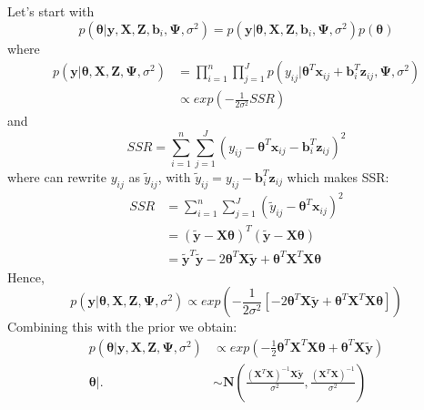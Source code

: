 \documentclass[a4paper]{article}
\begin{document}
Let's start with
 \begin{equation*}
	p(\bm{\theta}|\bm{y}, \bm{X}, \bm{Z}, \bm{b}_{i}, \bm{\Psi}, \sigma^2) = 	p(\bm{y}|\bm{\theta}, \bm{X}, \bm{Z}, \bm{b}_{i}, \bm{\Psi}, \sigma^2) p(\bm{\theta})
 \end{equation*}
where
 \begin{equation*}
  \begin{split}
  p(\bm{y}|\bm{\theta},\bm{X},\bm{Z},\bm{\Psi},\sigma^2) &= \prod_{i=1}^n \prod_{j=1}^Jp(y_{ij}|\bm{\theta}^{T}\bm{x}_{ij} + \bm{b}_{i}^{T}\bm{z}_{ij}, \bm{\Psi}, \sigma^2) \\
  &\propto exp(-\frac{1}{2\sigma^2}SSR)
  \end{split}
 \end{equation*}
and
 \begin{equation*}
  SSR = \sum_{i = 1}^{n}\sum_{j = 1}^{J}( y_{ij}-\bm{\theta}^{T}\bm{x}_{ij} - \bm{b}_{i}^{T}\bm{z}_{ij})^2
 \end{equation*}
where can rewrite $y_{ij}$ as $\tilde{y}_{ij}$, with $\tilde{y}_{ij} = y_{ij} - \bm{b}^{T}_{i}\bm{z}_{ij}$ which makes SSR:
 \begin{equation*}
  \begin{split}
   SSR& = \sum_{i = 1}^{n}\sum_{j = 1}^{J}( \tilde{y}_{ij}-\bm{\theta}^{T}\bm{x}_{ij})^2\\
   &= ( \tilde{\bm{y}} - \bm{X}\bm{\theta} )^{T}( \tilde{\bm{y}} - \bm{X}\bm{\theta} )\\
   &= \tilde{\bm{y}}^{T}\tilde{\bm{y}} - 2\bm{\theta}^{T}\bm{X}\tilde{\bm{y}} + \bm{\theta}^{T}\bm{X}^{T}\bm{X}\bm{\theta}
  \end{split}
 \end{equation*}
Hence,
 \begin{equation*}
	p(\bm{y}|\bm{\theta}, \bm{X}, \bm{Z}, \bm{\Psi}, \sigma^2) \propto exp(-\frac{1}{2\sigma^2}[- 2\bm{\theta}^{T}\bm{X}\tilde{\bm{y}} + \bm{\theta}^{T}\bm{X}^{T}\bm{X}\bm{\theta}])
 \end{equation*}
Combining this with the prior we obtain:
 \begin{equation}
  \begin{split}
	p(\bm{\theta}|\bm{y}, \bm{X}, \bm{Z}, \bm{\Psi}, \sigma^2)& \propto exp(-\frac{1}{2}\bm{\theta}^{T}\bm{X}^{T}\bm{X}\bm{\theta} + \bm{\theta}^{T}\bm{X}\tilde{\bm{y}}) \\
	\bm{\theta}|.&\sim \bm{N}\left(\frac{(\bm{X}^{T}\bm{X})^{-1}\bm{X}\bm{\tilde{y}}}{\sigma^2}, \frac{(\bm{X}^{T}\bm{X})^{-1}}{\sigma^2}\right)
  \end{split}
 \end{equation}
\end{document}
